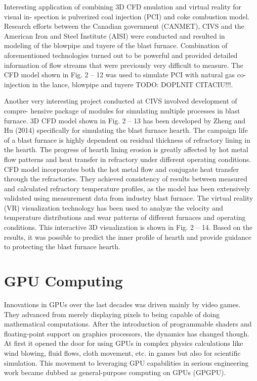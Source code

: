 Interesting application of combining 3D CFD smulation and virtual reality for visual in- spection is pulverized coal injection (PCI) and coke combustion model. Research efforts between the Canadian government (CANMET), CIVS and the American Iron and Steel Institute (AISI) were conducted and resulted in modeling of the blowpipe and tuyere of the blast furnace. Combination of aforementioned technologies turned out to be powerful and provided detailed information of flow streams that were previously very difficult to measure. The CFD model shown in Fig. 2 – 12 was used to simulate PCI with natural gas co-injection in the lance, blowpipe and tuyere TODO: DOPLNIT CITACIU!!!.

Another very interesting project conducted at CIVS involved development of compre- hensive package of modules for simulating multiple processes in blast furnace. 3D CFD model shown in Fig. 2 – 13 has been developed by Zheng and Hu (2014) specifically for simulating the blast furnace hearth. The campaign life of a blast furnace is highly dependent on residual thickness of refractory lining in the hearth. The progress of hearth lining erosion is greatly affected by hot metal flow patterns and heat transfer in refractory under different operating conditions. CFD model incorporates both the hot metal flow and conjugate heat transfer through the refractories. They achieved consistency of results between measured and calculated refractory temperature profiles, as the model has been extensively validated using measurement data from industry blast furnace. The virtual reality (VR) visualization technology has been used to analyze the velocity and temperature distributions and wear patterns of different furnaces and operating conditions. This interactive 3D visualization is shown in Fig. 2 – 14. Based on the results, it was possible to predict the inner profile of hearth and provide guidance to protecting the blast furnace hearth.



\section{GPU Computing}

\label{gpu-computing}
Innovations in GPUs over the last decades was driven mainly by video games. They advanced from merely displaying pixels to being capable of doing mathematical computations. After the introduction of programmable shaders and floating-point support on graphics processors, the dynamics has changed though. At first it opened the door for using GPUs in complex physics calculations like wind blowing, fluid flows, cloth movement, etc. in games but also for scientific simulation. This movement to leveraging GPU capabilities in serious engineering work became dubbed as general-purpose computing on GPUs (GPGPU).

